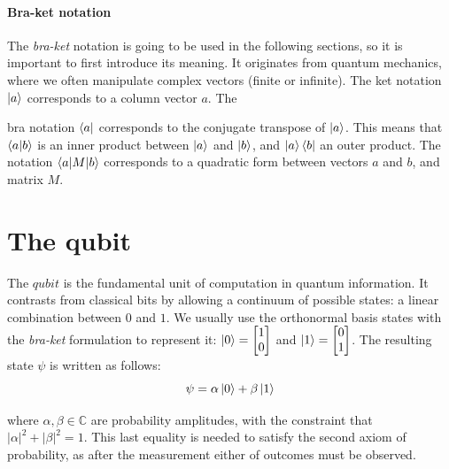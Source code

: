 \documentclass[12pt]{memoir}
\begin{document}
\paragraph*{Bra-ket notation}

The \textit{bra-ket} notation is going to be used in the following sections, so it is important to first introduce its meaning. It originates from quantum mechanics, where we often manipulate complex vectors (finite or infinite). The ket notation $\ket a$ corresponds to a column vector $a$. The

bra notation $\bra a$ corresponds to the conjugate transpose of $\ket a$. This means that $\braket{a|b}$ is an inner product between $\ket a$ and $\ket b$, and $\ket a \bra b$ an outer product. The notation $\braket{a|M|b}$ corresponds to a quadratic form between vectors $a$ and $b$, and matrix $M$.\medbreak


\section{The qubit}\label{section:qubit}

The $qubit$ is the fundamental unit of computation in quantum information. It contrasts from classical bits by allowing a continuum of possible states: a linear combination between $0$ and $1$. We usually use the orthonormal basis states with the \textit{bra-ket} formulation to represent it: $\ket 0 = \begin{bmatrix}

    1\\

    0

\end{bmatrix}$ and $\ket 1 = \begin{bmatrix}

    0\\

    1

\end{bmatrix}$. The resulting state $\psi$ is written as follows:
\begin{equation}
    \psi = \alpha \ket 0 + \beta \ket 1
\end{equation}

where $\alpha,\beta \in \mathbb{C}$ are probability amplitudes, with the constraint that $|\alpha|^2 + |\beta|^2 = 1$. This last equality is needed to satisfy the second axiom of probability, as after the measurement either of outcomes must be observed.\medbreak
\end{document}
